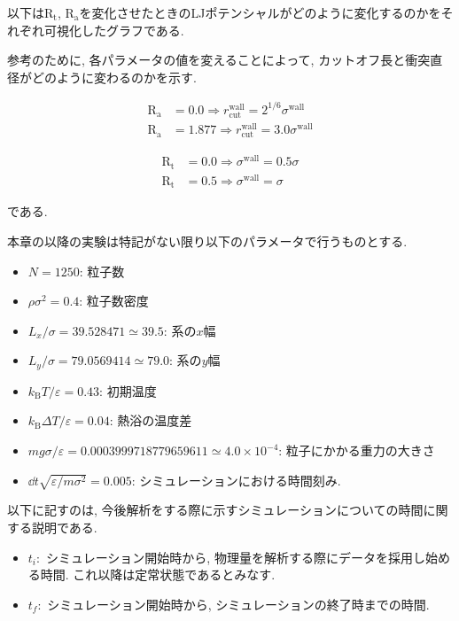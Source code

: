 以下は$\text{R}_\text{t}$, $\text{R}_\text{a}$を変化させたときのLJポテンシャルがどのように変化するのかをそれぞれ可視化したグラフである.

参考のために, 各パラメータの値を変えることによって, カットオフ長と衝突直径がどのように変わるのかを示す.

\begin{align}
  \text{R}_\text{a} &= 0.0 \Rightarrow r_{\text{cut}}^{\text{wall}} = 2^{1/6} \sigma^{\text{wall}} \\
  \text{R}_\text{a} &= 1.877 \Rightarrow r_{\text{cut}}^{\text{wall}} = 3.0 \sigma^{\text{wall}} 
\end{align}

\begin{align}
  \text{R}_\text{t} &= 0.0 \Rightarrow \sigma^{\text{wall}} = 0.5 \sigma \\
  \text{R}_\text{t} &= 0.5 \Rightarrow \sigma^{\text{wall}} = \sigma 
\end{align}

である. 



本章の以降の実験は特記がない限り以下のパラメータで行うものとする. 

\begin{itemize}
  \item $N = 1250$: 粒子数
  \item $\rho {\sigma}^2 = 0.4$: 粒子数密度
  \item $L_x / \sigma = 39.528471 \simeq 39.5$: 系の$x$幅
  \item $L_y / \sigma = 79.0569414 \simeq 79.0$: 系の$y$幅
  \item $k_{\text{B}} T / \varepsilon = 0.43$: 初期温度
  \item $k_{\text{B}} \Delta T / \varepsilon = 0.04$: 熱浴の温度差
  \item $mg\sigma/\varepsilon = 0.0003999718779659611 \simeq 4.0 \times 10^{-4}$: 粒子にかかる重力の大きさ
  \item $\dd t \sqrt{\varepsilon/m{\sigma}^2} = 0.005$: シミュレーションにおける時間刻み.
\end{itemize}


以下に記すのは, 今後解析をする際に示すシミュレーションについての時間に関する説明である.

\begin{itemize}
  \item $t_i \colon$ シミュレーション開始時から, 物理量を解析する際にデータを採用し始める時間. これ以降は定常状態であるとみなす.
  \item $t_f \colon$ シミュレーション開始時から, シミュレーションの終了時までの時間.
\end{itemize}

